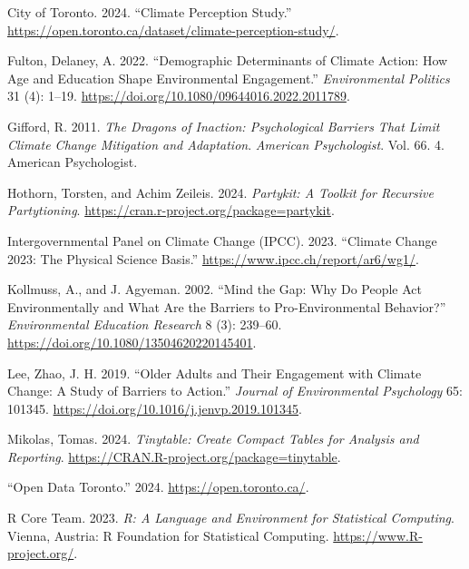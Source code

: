 \documentclass[
  letterpaper,
  DIV=11,
  numbers=noendperiod]{scrartcl}
\newlength{\cslhangindent}
\newenvironment{CSLReferences}[2] %
 {\begin{list}{}{%
  \setlength{\itemindent}{0pt}
  \setlength{\leftmargin}{0pt}
  \setlength{\parsep}{0pt}
  \ifodd #1
   \setlength{\leftmargin}{\cslhangindent}
   \setlength{\itemindent}{-1\cslhangindent}
  \fi
  \setlength{\itemsep}{#2\baselineskip}}}
 {\end{list}}
\begin{document}
\label{refs}
\begin{CSLReferences}{1}{0}
City of Toronto. 2024. {``Climate Perception Study.''}
\url{https://open.toronto.ca/dataset/climate-perception-study/}.

Fulton, Delaney, A. 2022. {``Demographic Determinants of Climate Action:
How Age and Education Shape Environmental Engagement.''}
\emph{Environmental Politics} 31 (4): 1--19.
\url{https://doi.org/10.1080/09644016.2022.2011789}.

Gifford, R. 2011. \emph{The Dragons of Inaction: Psychological Barriers
That Limit Climate Change Mitigation and Adaptation}. \emph{American
Psychologist}. Vol. 66. 4. American Psychologist.

Hothorn, Torsten, and Achim Zeileis. 2024. \emph{Partykit: A Toolkit for
Recursive Partytioning}.
\url{https://cran.r-project.org/package=partykit}.

Intergovernmental Panel on Climate Change (IPCC). 2023. {``Climate
Change 2023: The Physical Science Basis.''}
\url{https://www.ipcc.ch/report/ar6/wg1/}.

Kollmuss, A., and J. Agyeman. 2002. {``Mind the Gap: Why Do People Act
Environmentally and What Are the Barriers to Pro-Environmental
Behavior?''} \emph{Environmental Education Research} 8 (3): 239--60.
\url{https://doi.org/10.1080/13504620220145401}.

Lee, Zhao, J. H. 2019. {``Older Adults and Their Engagement with Climate
Change: A Study of Barriers to Action.''} \emph{Journal of Environmental
Psychology} 65: 101345.
\url{https://doi.org/10.1016/j.jenvp.2019.101345}.

Mikolas, Tomas. 2024. \emph{Tinytable: Create Compact Tables for
Analysis and Reporting}.
\url{https://CRAN.R-project.org/package=tinytable}.

{``Open Data Toronto.''} 2024. \url{https://open.toronto.ca/}.

R Core Team. 2023. \emph{{R: A Language and Environment for Statistical
Computing}}. Vienna, Austria: R Foundation for Statistical Computing.
\url{https://www.R-project.org/}.


\end{CSLReferences}
\end{document}
